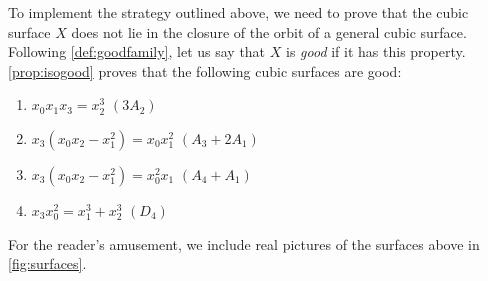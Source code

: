 \documentclass[12pt,reqno]{amsart}
\numberwithin{equation}{section}
\begin{document}
To implement the strategy outlined above, we need to prove that the cubic surface $X$ does not lie in the closure of the orbit of a general cubic surface.
Following \autoref{def:goodfamily}, let us say that $X$ is \emph{good} if it has this property.
\autoref{prop:isogood} proves that the following cubic surfaces are good:
\begin{enumerate}
\item $x_0x_1x_3 = x_2^3$ \quad $(3A_2)$
\item $x_3(x_0x_2-x_1^2) = x_0x_1^2$ \quad $(A_3 + 2A_1)$
\item $x_3(x_0x_2-x_1^2) = x_0^2x_1$ \quad $(A_4 + A_1)$
\item $x_3x_0^2 = x_1^3 + x_2^3$ \quad $(D_4)$
\end{enumerate}
For the reader's amusement, we include real pictures of the surfaces above in \autoref{fig:surfaces}.
\end{document}
